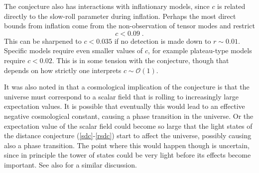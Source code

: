 \documentclass[11pt,a4paper]{article}
\numberwithin{equation}{section}
\numberwithin{table}{section}\setlength{\multlinegap}{25pt}
\newcommand{\cO}{\mathcal{O}}
\newcommand{\be}{\begin{equation}}
\newcommand{\ee}{\end{equation}}
\begin{document}
{The conjecture also has interactions with inflationary models, since $c$ is related directly to the slow-roll parameter during inflation. Perhaps the most direct bounds from inflation come from the non-observation of tensor modes and restrict \cite{Agrawal:2018own}
\be
c < 0.09 \;.
\ee
This can be sharpened to $c < 0.035$ if no detection is made down to $r \sim 0.01$. Specific models require even smaller values of $c$, for example plateau-type models require $c < 0.02$. This is in some tension with the conjecture, though that depends on how strictly one interprets $c \sim \cO\left( 1\right)$.

It was also noted in \cite{Agrawal:2018own} that a cosmological implication of the conjecture is that the universe must correspond to a scalar field that is rolling to increasingly large expectation values. It is possible that eventually this would lead to an effective negative cosmological constant, causing a phase transition in the universe. Or the expectation value of the scalar field could become so large that the light states of the distance conjecture (\ref{sdc}-\ref{rsdc}) start to affect the universe, possibly causing also a phase transition. The point where this would happen though is uncertain, since in principle the tower of states could be very light before its effects become important. See also \cite{Blumenhagen:2018hsh} for a similar discussion.

}
\end{document}
